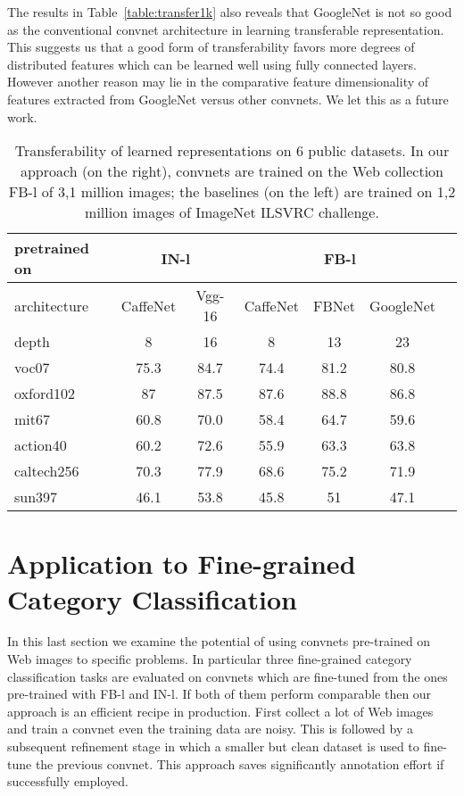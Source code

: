\documentclass[preprint,12pt]{elsarticle}
\begin{document}
The results in Table~\ref{table:transfer1k} also reveals that GoogleNet is not so good as the conventional convnet architecture in learning transferable representation. This suggests us that a good form of transferability favors more degrees of distributed features which can be learned well using fully connected layers. However another reason may lie in the comparative feature dimensionality of features extracted from GoogleNet versus other convnets. We let this as a future work.%
\begin{table}
\begin{centering}
\begin{tabular}{l|cc|cccc}
pretrained on & \multicolumn{2}{c}{IN-l} & \multicolumn{3}{c}{FB-l} \tabularnewline
\hline
architecture & CaffeNet & Vgg-16 & CaffeNet & FBNet & GoogleNet \tabularnewline
\hline
depth & 8 & 16 & 8 & 13 & 23 \tabularnewline
\hline\hline 
voc07 & 75.3 & 84.7 & 74.4 & 81.2 & 80.8 \tabularnewline
oxford102 & 87 & 87.5 & 87.6 & 88.8 & 86.8 \tabularnewline
mit67 & 60.8 & 70.0 & 58.4 & 64.7 & 59.6\tabularnewline
action40 & 60.2 & 72.6 & 55.9 & 63.3 & 63.8 \tabularnewline
caltech256 & 70.3 & 77.9 & 68.6 & 75.2 & 71.9 \tabularnewline
sun397 & 46.1 & 53.8 & 45.8 & 51 & 47.1 \tabularnewline
\end{tabular}
\par\end{centering}
\caption{Transferability of learned representations on 6 public datasets. In our approach (on the right), convnets are trained on the Web collection FB-l of 3,1 million images; the baselines (on the left) are trained on 1,2 million images of ImageNet ILSVRC challenge.}
\label{table:deeper1k}
\end{table}

\section{Application to Fine-grained Category Classification}\label{sec:finetune}
\noindent In this last section we examine the potential of using convnets pre-trained on Web images to specific problems. In particular three fine-grained category classification tasks are evaluated on convnets which are fine-tuned from the ones pre-trained with FB-l and IN-l. If both of them perform comparable then our approach is an efficient recipe in production. First collect a lot of Web images and train a convnet even the training data are noisy. This is followed by a subsequent refinement stage in which a smaller but clean dataset is used to fine-tune the previous convnet. This approach saves significantly annotation effort if successfully employed. 
\end{document}
